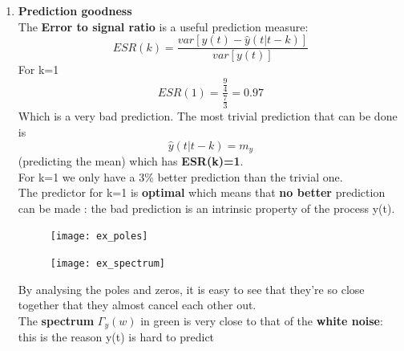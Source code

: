 \begin{enumerate}
\item \textbf{Prediction goodness}\\
The \textbf{Error to signal ratio} is a useful prediction measure:
$$ ESR(k) = \frac{var[y(t) - \hat{y}(t|t-k)]}{var[y(t)]}$$
For k=1 $$ESR(1) = \frac{\frac{9}{4}}{\frac{7}{3}} = 0.97$$
Which is a very bad prediction. The most trivial prediction that can be done is 
$$ \hat{y}(t|t-k) = m_y$$  (predicting the mean) which has \textbf{ESR(k)=1}.\\
For k=1 we only have a 3\% better prediction than the trivial one.\\
The predictor for k=1 is \textbf{optimal} which means that \textbf{no better } prediction can be made : the bad prediction is an intrinsic property of the process y(t).\\
 
\begin{figure}[H]
\begin{minipage}{.5\textwidth}
 \centering
  \texttt{[image: ex\_poles]}
\end{minipage}%
	\begin{minipage}{.5\textwidth}
  \centering
  \texttt{[image: ex\_spectrum]}
\end{minipage}%
\end{figure}
By analysing the poles and zeros, it is easy to see that they're so close together that they almost cancel each other out.\\
The \textbf{spectrum} $\Gamma_y(w)$  in green is very close to that of the \textbf{white noise}: this is the reason y(t) is hard to predict 
\end{enumerate}


